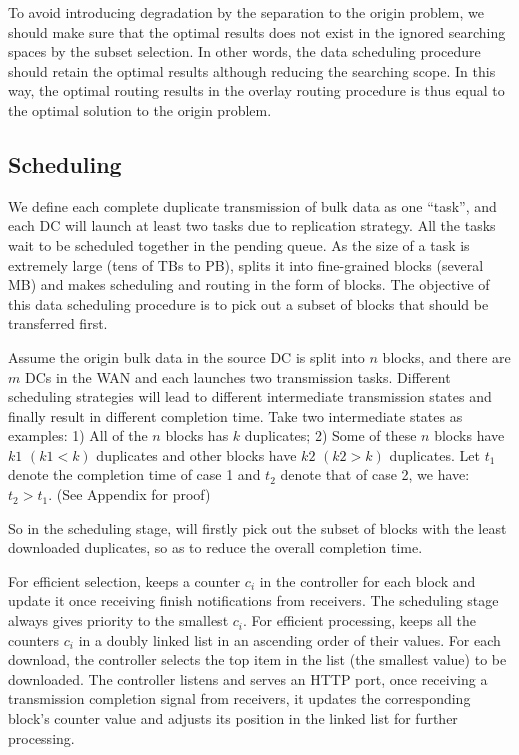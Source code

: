 To avoid introducing degradation by the separation to the origin problem, we should make sure that the optimal results does not exist in the ignored searching spaces by the subset selection. In other words, the data scheduling procedure should retain the optimal results although reducing the searching scope. In this way, the optimal routing results in the overlay routing procedure is thus equal to the optimal solution to the origin problem.

\subsection{Scheduling}
\label{subsec:logic:scheduling}

We define each complete duplicate transmission of bulk data as one ``task'', and each DC will launch at least two tasks due to replication strategy. All the tasks wait to be scheduled together in the pending queue. As the size of a task is extremely large (tens of TBs to PB), \name splits it into fine-grained blocks (several MB) and makes scheduling and routing in the form of blocks. The objective of this data scheduling procedure is to pick out a subset of blocks that should be transferred first.

Assume the origin bulk data in the source DC is split into $n$ blocks, and there are $m$ DCs in the WAN and each launches two transmission tasks. Different scheduling strategies will lead to different intermediate transmission states and finally result in different completion time. Take two intermediate states as examples: 1) All of the $n$ blocks has $k$ duplicates; 2) Some of these $n$ blocks have $k1$ $(k1<k)$ duplicates and other blocks have $k2$ $(k2>k)$ duplicates. Let $t_1$ denote the completion time of case 1 and $t_2$ denote that of case 2, we have: $t_2 > t_1$. (See Appendix for proof)

So in the scheduling stage, \name will firstly pick out the subset of blocks with the least downloaded duplicates, so as to reduce the overall completion time.

For efficient selection, \name keeps a counter $c_i$ in the controller for each block and update it once receiving finish notifications from receivers. The scheduling stage always gives priority to the smallest $c_i$. For efficient processing, \name keeps all the counters $c_i$ in a doubly linked list in an ascending order of their values. For each download, the controller selects the top item in the list (the smallest value) to be downloaded. The controller listens and serves an HTTP port, once receiving a transmission completion signal from receivers, it updates the corresponding block's counter value and adjusts its position in the linked list for further processing.

